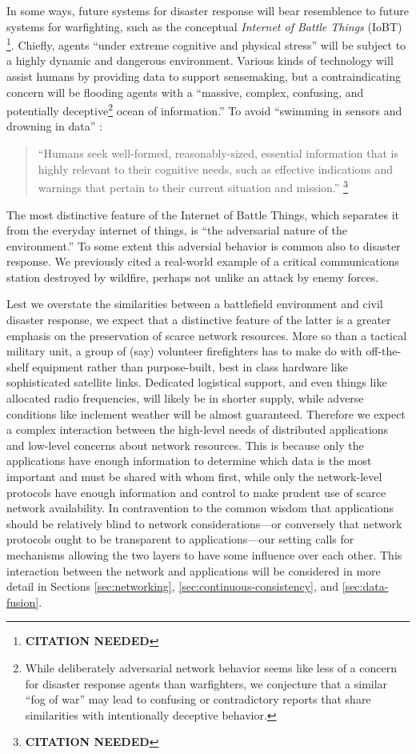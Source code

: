 \documentclass[]             %
{NASA}                       %
\theoremstyle{definition}
\newcommand{\citationneeded}{\footnote{\textbf{CITATION NEEDED}}}
\begin{document}
In some ways, future systems for disaster response will bear
resemblence to future systems for warfighting, such as the conceptual
\emph{Internet of Battle Things} (IoBT) \citationneeded. Chiefly,
agents ``under extreme cognitive and physical stress'' will be subject
to a highly dynamic and dangerous environment. Various kinds of
technology will assist humans by providing data to support
sensemaking, but a contraindicating concern will be flooding agents with a
``massive, complex, confusing, and potentially
deceptive\footnote{While deliberately adversarial network behavior
seems like less of a concern for disaster response agents than
warfighters, we conjecture that a similar ``fog of war'' may
lead to confusing or contradictory reports that share similarities
with intentionally deceptive behavior.} ocean of information.'' To
avoid ``swimming in sensors and drowning in data''
\cite{2010:magnuson}:
\begin{quote}
``Humans seek well-formed, reasonably-sized, essential information
  that is highly relevant to their cognitive needs, such as effective
  indications and warnings that pertain to their current situation and
  mission.'' \citationneeded
\end{quote}
The most distinctive feature of the Internet of Battle Things, which
separates it from the everyday internet of things, is ``the
adversarial nature of the environment.'' To some extent this adversial
behavior is common also to disaster response. We previously cited a
real-world example of a critical communications station destroyed by
wildfire, perhaps not unlike an attack by enemy forces.

Lest we overstate the similarities between a battlefield environment
and civil disaster response, we expect that a distinctive feature of
the latter is a greater emphasis on the preservation of scarce network
resources. More so than a tactical military unit, a group of (say)
volunteer firefighters has to make do with off-the-shelf equipment
rather than purpose-built, best in class hardware like sophisticated
satellite links. Dedicated logistical support, and even things like
allocated radio frequencies, will likely be in shorter supply, while
adverse conditions like inclement weather will be almost
guaranteed. Therefore we expect a complex interaction between the
high-level needs of distributed applications and low-level concerns
about network resources. This is because only the applications have
enough information to determine which data is the most important and
must be shared with whom first, while only the network-level protocols
have enough information and control to make prudent use of scarce
network availability. In contravention to the common wisdom that
applications should be relatively blind to network considerations---or
conversely that network protocols ought to be transparent to
applications---our setting calls for mechanisms allowing the two
layers to have some influence over each other. This interaction
between the network and applications will be considered in more detail
in Sections \ref{sec:networking}, \ref{sec:continuous-consistency},
and \ref{sec:data-fusion}.
\end{document}
